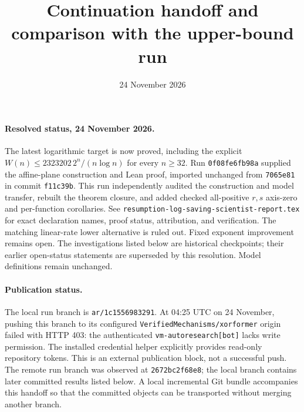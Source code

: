 \documentclass[11pt]{article}
\begin{document}
\title{Continuation handoff and comparison with the upper-bound run}
\author{}\date{24 November 2026}\maketitle

\paragraph{Resolved status, 24 November 2026.}
The latest logarithmic target is now proved, including the explicit
$W(n)\leq2323202\,2^n/(n\log n)$ for every $n\geq32$.
Run \texttt{0f08fe6fb98a} supplied the affine-plane construction and
Lean proof, imported unchanged from \texttt{7065e81} in commit
\texttt{f11c39b}. This run independently audited the construction and
model transfer, rebuilt the theorem closure, and added checked all-positive
$r,s$ axis-zero and per-function corollaries. See
\texttt{resumption-log-saving-scientist-report.tex} for exact declaration
names, proof status, attribution, and verification. The matching linear-rate
lower alternative is ruled out. Fixed exponent improvement remains open.
The investigations listed below are historical checkpoints; their earlier
open-status statements are superseded by this resolution. Model definitions
remain unchanged.

\paragraph{Publication status.}
The local run branch is \texttt{ar/1c1556983291}. At 04:25 UTC on
24 November, pushing this branch to its configured
\texttt{VerifiedMechanisms/xorformer} origin failed with HTTP 403:
the authenticated \texttt{vm-autoresearch[bot]} lacks write permission.
The installed credential helper explicitly provides read-only repository
tokens. This is an external publication block, not a successful push.
The remote run branch was observed at \texttt{2672bc2f68e8}; the
local branch contains later committed results listed below. A local
incremental Git bundle accompanies this handoff so that the committed
objects can be transported without merging another branch.
\end{document}
